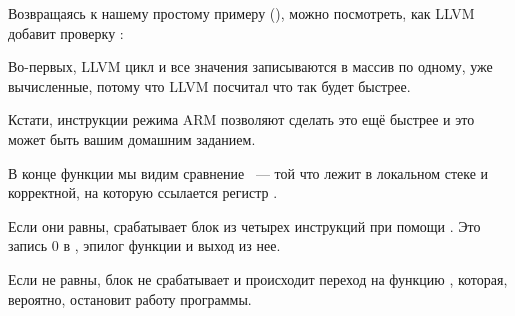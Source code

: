 \subsectionold{\OptimizingXcodeIV (\ThumbTwoMode)}

Возвращаясь к нашему простому примеру
 (),
можно посмотреть, как LLVM добавит проверку :



Во-первых, LLVM  цикл и все значения записываются в массив по одному, 
уже вычисленные, потому что LLVM посчитал что так будет быстрее.

Кстати, инструкции режима ARM позволяют сделать это ещё быстрее и это может быть вашим 
домашним заданием.

В конце функции мы видим сравнение ~--- той что лежит в локальном стеке и корректной, 
на которую ссылается регистр .

Если они равны, срабатывает блок из четырех инструкций при помощи .
Это запись 0 в , эпилог функции и выход из нее.

Если  не равны, блок не срабатывает и происходит
переход на функцию , которая, вероятно, остановит работу программы.

